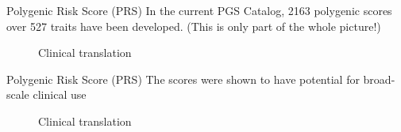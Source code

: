 \documentclass{beamer}
\begin{document}
\begin{frame}{Polygenic Risk Score (PRS)}
In the current PGS Catalog, 2163 polygenic scores over 527 traits have been developed. (This is only part of the whole picture!)
    \begin{figure}[h]	\noindent{}
    \caption{Clinical translation}
    \label{fig:traits}
\end{figure}
\end{frame}

\begin{frame}{Polygenic Risk Score (PRS)}
The scores were shown to have potential for broad-scale clinical use
\begin{figure}[h]	\noindent{}
    \caption{Clinical translation}
    \label{fig:translation}
\end{figure}

\end{frame}
\end{document}
